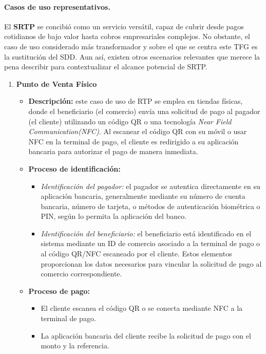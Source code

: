 \paragraph{Casos de uso representativos.}
El \textbf{SRTP} se concibió como un servicio versátil, capaz de cubrir desde pagos cotidianos de bajo valor hasta cobros empresariales complejos. No obstante, el caso de uso considerado más transformador y sobre el que se centra este TFG es la sustitución del SDD. Aun así, existen otros escenarios relevantes que merece la pena describir para contextualizar el alcance potencial de SRTP.

\begin{enumerate}
    \item \textbf{Punto de Venta Físico}
    \begin{itemize}
        \item \textbf{Descripción:} este caso de uso de RTP se emplea en tiendas físicas, donde el beneficiario (el comercio) envía una solicitud de pago al pagador (el cliente) utilizando un código QR o una tecnología \textit{Near Field Communication(NFC)}. Al escanear el código QR con su móvil o usar NFC en la terminal de pago, el cliente es redirigido a su aplicación bancaria para autorizar el pago de manera inmediata.
        \item \textbf{Proceso de identificación:}
        \begin{itemize}
            \item \textit{Identificación del pagador:} el pagador se autentica directamente en su aplicación bancaria, generalmente mediante su número de cuenta bancaria, número de tarjeta, o métodos de autenticación biométrica o PIN, según lo permita la aplicación del banco.
            \item \textit{Identificación del beneficiario:} el beneficiario está identificado en el sistema mediante un ID de comercio asociado a la terminal de pago o al código QR/NFC escaneado por el cliente. Estos elementos proporcionan los datos necesarios para vincular la solicitud de pago al comercio correspondiente.
        \end{itemize}
        \item \textbf{Proceso de pago:}
        \begin{itemize}
            \item El cliente escanea el código QR o se conecta mediante NFC a la terminal de pago.
            \item La aplicación bancaria del cliente recibe la solicitud de pago con el monto y la referencia.

\end{itemize}
\end{itemize}
\end{enumerate}

